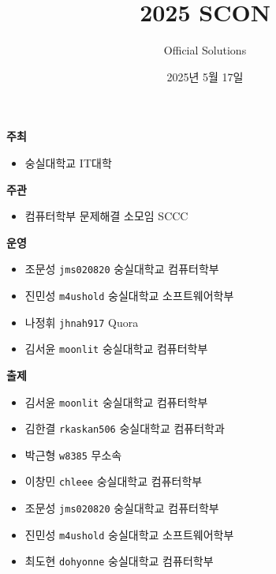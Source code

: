 
\usetikzlibrary{arrows.meta,matrix,decorations.pathreplacing}

\title{2025 SCON}
\subtitle{}
\author{Official Solutions}
\date{2025년 5월 17일}


    \setcounter{framenumber}{-1}
    \frame{\titlepage}

    \begin{frame} %
        \textbf{주최} %
        \begin{itemize}
            \item 숭실대학교 IT대학
        \end{itemize}
        \vspace{3mm}
        \textbf{주관} %
        \begin{itemize}
            \item 컴퓨터학부 문제해결 소모임 SCCC
        \end{itemize}
        \vspace{3mm}
        \textbf{운영} %
        \begin{itemize}
            \item 조문성 \tabto{1.2cm} \texttt{jms020820} \tabto{8cm} {\color{gray} 숭실대학교 컴퓨터학부}
            \item 진민성 \tabto{1.2cm} \texttt{m4ushold} \tabto{8cm} {\color{gray} 숭실대학교 소프트웨어학부}
            \item 나정휘 \tabto{1.2cm} \texttt{jhnah917} \tabto{8cm} {\color{gray} Quora}
            \item 김서윤 \tabto{1.2cm} \texttt{moonlit} \tabto{8cm} {\color{gray} 숭실대학교 컴퓨터학부}
        \end{itemize}
    \end{frame}
    
    \begin{frame}
        \textbf{출제} %
        \begin{itemize}
            \item 김서윤 \tabto{1.2cm} \texttt{moonlit} \tabto{8cm} {\color{gray} 숭실대학교 컴퓨터학부}
            \item 김한결 \tabto{1.2cm} \texttt{rkaskan506} \tabto{8cm} {\color{gray} 숭실대학교 컴퓨터학과}
            \item 박근형 \tabto{1.2cm} \texttt{w8385} \tabto{8cm} {\color{gray} 무소속}
            \item 이창민 \tabto{1.2cm} \texttt{chleee} \tabto{8cm} {\color{gray} 숭실대학교 컴퓨터학부}
            \item 조문성 \tabto{1.2cm} \texttt{jms020820} \tabto{8cm} {\color{gray} 숭실대학교 컴퓨터학부}
            \item 진민성 \tabto{1.2cm} \texttt{m4ushold} \tabto{8cm} {\color{gray} 숭실대학교 소프트웨어학부}
            \item 최도현 \tabto{1.2cm} \texttt{dohyonne} \tabto{8cm} {\color{gray} 숭실대학교 컴퓨터학부}
        \end{itemize}
    \end{frame}

